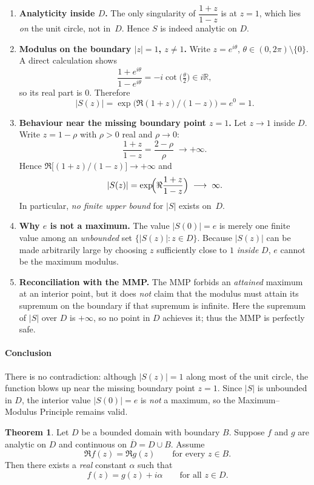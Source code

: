 \documentclass[12pt]{article}
\theoremstyle{definition} %
\newtheorem{theorem}{Theorem}
\theoremstyle{plain} %
\begin{document}
\begin{enumerate}
\item
  \textbf{Analyticity inside $D$.}  
  The only singularity of $\dfrac{1+z}{1-z}$ is at $z=1$,
  which lies \emph{on} the unit circle, not in~$D$.  
  Hence $S$ is indeed analytic on $D$.

\item
  \textbf{Modulus on the boundary $|z|=1$, $z\neq1$.}  
  Write $z=e^{i\theta}$, $\theta\in(0,2\pi)\setminus\{0\}$.
  A direct calculation shows
  \[
     \frac{1+e^{i\theta}}{1-e^{i\theta}}
     =-i\cot\!\bigl(\tfrac{\theta}{2}\bigr)\in i\mathbb R ,
  \]
  so its real part is $0$.  
  Therefore
  \[
      |S(z)|=\exp\bigl(\Re(1+z)/(1-z)\bigr)=e^{0}=1.
  \]

\item
  \textbf{Behaviour near the missing boundary point $z=1$.}  
  Let $z\to1$ inside $D$.  Write $z=1-\rho$ with $\rho>0$ real and $\rho\to0$:
  \[
      \frac{1+z}{1-z}=\frac{2-\rho}{\rho}\; \longrightarrow +\infty.
  \]
  Hence $\Re\bigl[(1+z)/(1-z)\bigr]\to+\infty$ and
  \[
      |S(z)|=\exp\!\Bigl(\Re\frac{1+z}{1-z}\Bigr)\;\longrightarrow\;\infty .
  \]
  In particular, \emph{no finite upper bound} for $|S|$ exists on~$D$.

\item
  \textbf{Why $e$ is not a maximum.}  
  The value $|S(0)|=e$ is merely one finite value among
  an \emph{unbounded} set $\{|S(z)|:z\in D\}$.
  Because $|S(z)|$ can be made arbitrarily large by choosing $z$ sufficiently
  close to $1$ \emph{inside} $D$, $e$ cannot be the maximum modulus.

\item
  \textbf{Reconciliation with the MMP.}  
  The MMP forbids an \emph{attained} maximum at an interior point,
  but it does \emph{not} claim that the modulus must
  attain its supremum on the boundary if that supremum is infinite.
  Here the supremum of $|S|$ over $D$ is $+\infty$,
  so no point in $D$ achieves it; thus the MMP is perfectly safe.
\end{enumerate}

\paragraph{Conclusion}
There is no contradiction: although $|S(z)|=1$ along most of the unit circle,
the function blows up near the missing boundary point $z=1$.
Since $|S|$ is unbounded in $D$, the interior value $|S(0)|=e$
is \emph{not} a maximum, so the Maximum–Modulus Principle remains valid.
\begin{theorem}
  \label{thm:equal‑real‑parts}
  Let $D$ be a bounded domain with boundary $B$.
  Suppose $f$ and $g$ are analytic on $D$ and continuous on $\overline{D}=D\cup B$.
  Assume
  \[
     \Re f(z)=\Re g(z)\qquad\text{for every }z\in B.
  \]
  Then there exists a \emph{real} constant $\alpha$ such that
  \[
     f(z)=g(z)+i\alpha\qquad\text{for all }z\in D.
  \]
  \end{theorem}
  
\end{document}
